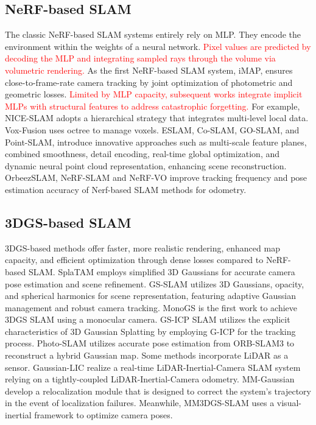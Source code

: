\documentclass[lettersize,journal]{IEEEtran}
\begin{document}
\subsection{NeRF-based SLAM}
The classic NeRF-based SLAM systems entirely rely on MLP. They encode the environment within the weights of a neural network. \textcolor{red}{Pixel values are predicted by decoding the MLP and integrating sampled rays through the volume via volumetric rendering.} As the first NeRF-based SLAM system, iMAP\cite{imap}, ensures close-to-frame-rate camera tracking by joint optimization of photometric and geometric losses. \textcolor{red}{Limited by MLP capacity, subsequent works integrate implicit MLPs with structural features to address catastrophic forgetting.} For example, NICE-SLAM\cite{niceslam} adopts a hierarchical strategy that integrates multi-level local data. Vox-Fusion uses octree to manage voxels. ESLAM\cite{esslam}, Co-SLAM\cite{coslam}, GO-SLAM\cite{goslam}, and Point-SLAM\cite{pointslam}, introduce innovative approaches such as multi-scale feature planes, combined smoothness, detail encoding, real-time global optimization, and dynamic neural point cloud representation, enhancing scene reconstruction. OrbeezSLAM\cite{orbeez}, NeRF-SLAM\cite{nerfslam} and NeRF-VO\cite{nerfvo} improve tracking frequency and pose estimation accuracy of Nerf-based SLAM methods for odometry.

\subsection{3DGS-based SLAM}
3DGS-based methods offer faster, more realistic rendering, enhanced map capacity, and efficient optimization through dense losses compared to NeRF-based SLAM. SplaTAM\cite{splatam} employs simplified 3D Gaussians for accurate camera pose estimation and scene refinement. GS-SLAM\cite{gsslam} utilizes 3D Gaussians, opacity, and spherical harmonics for scene representation, featuring adaptive Gaussian management and robust camera tracking. MonoGS\cite{monogs} is the first work to achieve 3DGS SLAM using a monocular camera. GS-ICP\cite{gsicp} SLAM utilizes the explicit characteristics of 3D Gaussian Splatting by employing G-ICP\cite{gicp} for the tracking process. Photo-SLAM\cite{photoslam} utilizes accurate pose estimation from ORB-SLAM3\cite{orbslam3} to reconstruct a hybrid Gaussian map. Some methods incorporate LiDAR as a sensor. Gaussian-LIC\cite{gaussianlic} realize a real-time LiDAR-Inertial-Camera SLAM system relying on a tightly-coupled LiDAR-Inertial-Camera odometry. MM-Gaussian\cite{mmgaussian} develop a relocalization module that is designed to correct the system’s trajectory in the event of localization failures. Meanwhile, MM3DGS-SLAM\cite{mm3dgs} uses a visual-inertial framework to optimize camera poses.
\end{document}
